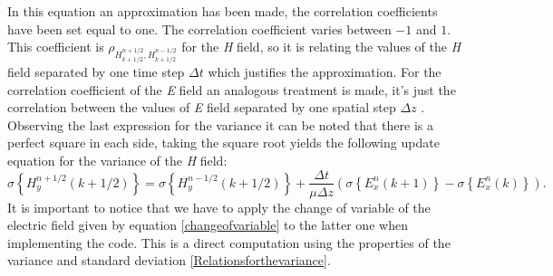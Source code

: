 \documentclass[12pt, oneside]{book}
\begin{document}
In this equation an approximation has been made, the correlation coefficients have been set equal to one. The correlation coefficient varies between $-1$ and $1$. This coefficient is $\rho_{H_{k+1/2}^{n+1/2},H_{k+1/2}^{n-1/2}}$ for the \textit{H} field, so it is relating the values of the \textit{H} field separated by one time step $\Delta t$ which justifies the approximation. For the correlation coefficient of the \textit{E} field an analogous treatment is made, it's just the correlation between the values of \textit{E} field separated by one spatial step $\Delta z$ \cite{smith2011stochastic}. \\
\indent Observing the last expression for the variance it can be noted that there is a perfect square in each side, taking the square root yields the following update equation for the variance of the \textit{H} field:
\begin{equation}
\sigma\left\lbrace H_y^{n+1/2}(k+1/2) \right\rbrace = \sigma\left\lbrace H_y^{n-1/2}(k+1/2)\right\rbrace + \frac{\Delta t}{\mu \Delta z}\left(\sigma \left\lbrace E_x^n(k+1)\right\rbrace -\sigma\left\lbrace E_x^n(k)\right\rbrace \right).
\end{equation}
It is important to notice that we have to apply the change of variable of the electric field given by equation \ref{changeofvariable} to the latter one when implementing the code. This is a direct computation using the properties of the variance and standard deviation \ref{Relationsforthevariance}.
\end{document}
